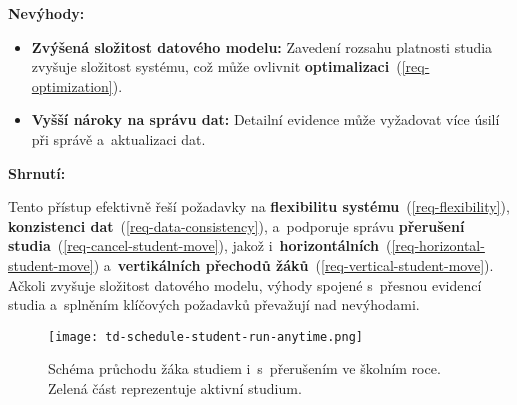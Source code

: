 \begin{enumerate}
    \textbf{Nevýhody:}

    \begin{itemize}
        \item \textbf{Zvýšená složitost datového modelu:} Zavedení rozsahu platnosti studia zvyšuje složitost systému, což může ovlivnit \textbf{optimalizaci}~(\ref{req-optimization}).
        \item \textbf{Vyšší nároky na správu dat:} Detailní evidence může vyžadovat více úsilí při správě a~aktualizaci dat.
    \end{itemize}

    \textbf{Shrnutí:}

    Tento přístup efektivně řeší požadavky na \textbf{flexibilitu systému}~(\ref{req-flexibility}), \textbf{konzistenci dat}~(\ref{req-data-consistency}), a~podporuje správu \textbf{přerušení studia}~(\ref{req-cancel-student-move}), jakož i~\textbf{horizontálních}~(\ref{req-horizontal-student-move}) a~\textbf{vertikálních přechodů žáků}~(\ref{req-vertical-student-move}). Ačkoli zvyšuje složitost datového modelu, výhody spojené s~přesnou evidencí studia a~splněním klíčových požadavků převažují nad nevýhodami.

    \begin{figure}[H]
        \centering
        \texttt{[image: td-schedule-student-run-anytime.png]}
        \caption{Schéma průchodu žáka studiem i~s~přerušením ve školním roce. Zelená část reprezentuje aktivní studium.}
        \label{fig:td-schedule-student-run-anytime}
    \end{figure}
\end{enumerate}

